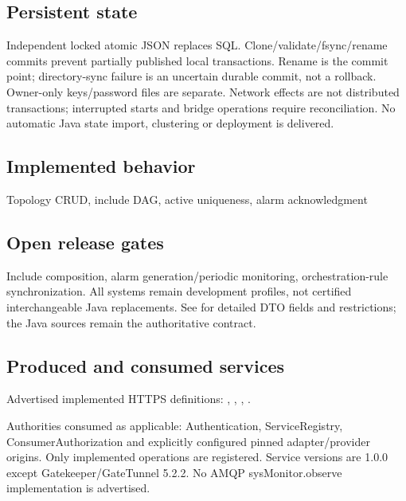 \documentclass[a4paper]{arrowhead}
\begin{document}
\subsection{Persistent state}
Independent locked atomic JSON replaces SQL. Clone/validate/fsync/rename commits prevent partially published local transactions. Rename is the commit point; directory-sync failure is an uncertain durable commit, not a rollback. Owner-only keys/password files are separate. Network effects are not distributed transactions; interrupted starts and bridge operations require reconciliation. No automatic Java state import, clustering or deployment is delivered.
\subsection{Implemented behavior}
Topology CRUD, include DAG, active uniqueness, alarm acknowledgment
\subsection{Open release gates}
Include composition, alarm generation/periodic monitoring, orchestration-rule synchronization. All systems remain development profiles, not certified interchangeable Java replacements. See  for detailed DTO fields and restrictions; the Java sources remain the authoritative contract.
\subsection{Produced and consumed services}
Advertised implemented HTTPS definitions: , \allowbreak {}, \allowbreak {}, \allowbreak {}.\par
Authorities consumed as applicable: Authentication, ServiceRegistry, ConsumerAuthorization and explicitly configured pinned adapter/provider origins. Only implemented operations are registered. Service versions are 1.0.0 except Gatekeeper/GateTunnel 5.2.2. No AMQP sysMonitor.observe implementation is advertised.
\clearpage
\end{document}
